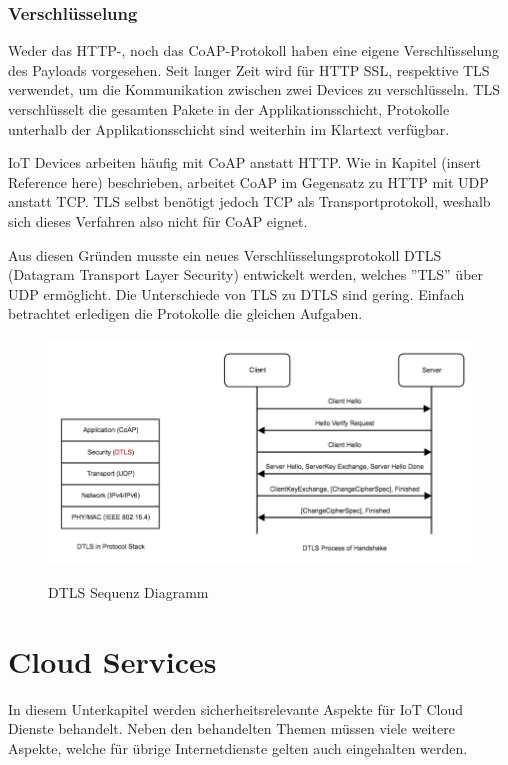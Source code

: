 \subsubsection{Verschlüsselung}
Weder das HTTP-, noch das CoAP-Protokoll haben eine eigene Verschlüsselung des Payloads vorgesehen. Seit langer Zeit wird für HTTP SSL, respektive TLS verwendet, um die Kommunikation zwischen zwei Devices zu verschlüsseln. TLS verschlüsselt die gesamten Pakete in der Applikationsschicht, Protokolle unterhalb der Applikationsschicht sind weiterhin im Klartext verfügbar. 

IoT Devices arbeiten häufig mit CoAP anstatt HTTP. Wie in Kapitel (insert Reference here) beschrieben, arbeitet CoAP im Gegensatz zu HTTP mit UDP anstatt TCP. TLS selbst benötigt jedoch TCP als Transportprotokoll, weshalb sich dieses Verfahren also nicht für CoAP eignet.

Aus diesen Gründen musste ein neues Verschlüsselungsprotokoll DTLS (Datagram Transport Layer Security) entwickelt werden, welches ''TLS'' über UDP ermöglicht. Die Unterschiede von TLS zu DTLS sind gering. Einfach betrachtet erledigen die Protokolle die gleichen Aufgaben.

\begin{figure}[H]
\centering
\includegraphics[scale=0.5]{../02_Analyse/images/coap_dtls_diagram.png}
\caption{DTLS Sequenz Diagramm} \cite{DTLSDiagram}
\end{figure}
\newpage
\section{Cloud Services}
In diesem Unterkapitel werden sicherheitsrelevante Aspekte für IoT Cloud Dienste behandelt. Neben den behandelten Themen müssen viele weitere Aspekte, welche für übrige Internetdienste gelten auch eingehalten werden.
